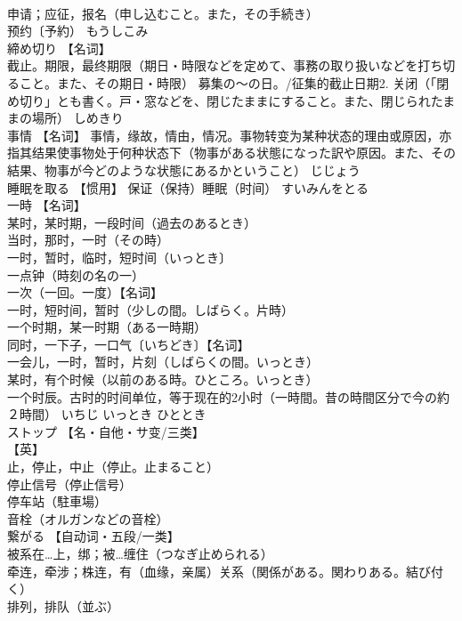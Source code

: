 \documentclass[8pt]{extreport}
\begin{document}
\begin{CJK}{UTF8}{min}
\\	申请；应征，报名（申し込むこと。また，その手続き） 
\\	预约〔予約）	もうしこみ	
\\	締め切り	【名词】 
\\	截止。期限，最终期限（期日・時限などを定めて、事務の取り扱いなどを打ち切ること。また、その期日・時限） 募集の～の日。/征集的截止日期2. 关闭（「閉め切り」とも書く。戸・窓などを、閉じたままにすること。また、閉じられたままの場所）	しめきり	
\\	事情	【名词】 事情，缘故，情由，情况。事物转变为某种状态的理由或原因，亦指其结果使事物处于何种状态下（物事がある状態になった訳や原因。また、その結果、物事が今どのような状態にあるかということ）	じじょう	
\\	睡眠を取る	【惯用】 保证（保持）睡眠（时间）	すいみんをとる	
\\	一時	【名词】 
\\	某时，某时期，一段时间（過去のあるとき） 
\\	当时，那时，一时（その時） 
\\	一时，暂时，临时，短时间（いっとき〕 
\\	一点钟（時刻の名の一） 
\\	一次（一回。一度）【名词】 
\\	一时，短时间，暂时（少しの間。しばらく。片時） 
\\	一个时期，某一时期（ある一時期） 
\\	同时，一下子，一口气〔いちどき〕【名词】 
\\	一会儿，一时，暂时，片刻（しばらくの間。いっとき） 
\\	某时，有个时候（以前のある時。ひところ。いっとき） 
\\	一个时辰。古时的时间单位，等于现在的2小时（一時間。昔の時間区分で今の約２時間）	いちじ いっとき ひととき	
\\	ストップ	【名・自他・サ变/三类】 
\\	【英】
\\	止，停止，中止（停止。止まること） 
\\	停止信号（停止信号） 
\\	停车站（駐車場） 
\\	音栓（オルガンなどの音栓）		
\\	繋がる	【自动词・五段/一类】 
\\	被系在…上，绑；被…缠住（つなぎ止められる） 
\\	牵连，牵涉；株连，有（血缘，亲属）关系（関係がある。関わりある。結び付く） 
\\	排列，排队（並ぶ） 

\end{CJK}
\end{document}
